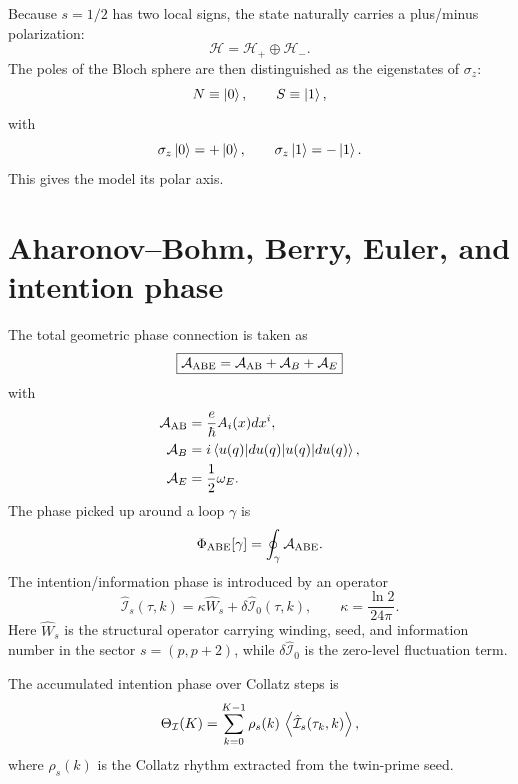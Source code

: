 \documentclass[11pt,a4paper]{article}
\begin{document}
Because $s=1/2$ has two local signs, the state naturally carries a plus/minus polarization:
\begin{equation}
\mathcal H=\mathcal H_+\oplus\mathcal H_-.
\end{equation}
The poles of the Bloch sphere are then distinguished as the eigenstates of $\sigma_z$:
\begin{equation}
N\equiv\ket{0},\qquad S\equiv\ket{1},
\end{equation}
with
\begin{equation}
\sigma_z\ket{0}=+\ket{0},\qquad \sigma_z\ket{1}=-\ket{1}.
\end{equation}
This gives the model its polar axis.

\section{Aharonov--Bohm, Berry, Euler, and intention phase}
The total geometric phase connection is taken as
\begin{equation}
\boxed{\mathcal A_{\rm ABE}=\mathcal A_{\rm AB}+\mathcal A_B+\mathcal A_E}
\end{equation}
with
\begin{align}
\mathcal A_{\rm AB}&=\frac{e}{\hbar}A_i(x)dx^i,\\
\mathcal A_B&=i\braket{u(q)|du(q)},\\
\mathcal A_E&=\frac12\omega_E.
\end{align}
The phase picked up around a loop $\gamma$ is
\begin{equation}
\Phi_{\rm ABE}[\gamma]=\oint_\gamma \mathcal A_{\rm ABE}.
\end{equation}
The intention/information phase is introduced by an operator
\begin{equation}
\boxed{\hat{\mathcal I}_s(\tau,k)=\kappa\hat W_s+\delta\hat{\mathcal I}_0(\tau,k),\qquad \kappa=\frac{\ln 2}{24\pi}.}
\end{equation}
Here $\hat W_s$ is the structural operator carrying winding, seed, and information number in the sector $s=(p,p+2)$, while $\delta\hat{\mathcal I}_0$ is the zero-level fluctuation term.

The accumulated intention phase over Collatz steps is
\begin{equation}
\Theta_{\mathcal I}(K)=\sum_{k=0}^{K-1}\rho_s(k)\,\expval{\hat{\mathcal I}_s(\tau_k,k)},
\end{equation}
where $\rho_s(k)$ is the Collatz rhythm extracted from the twin-prime seed.
\end{document}
